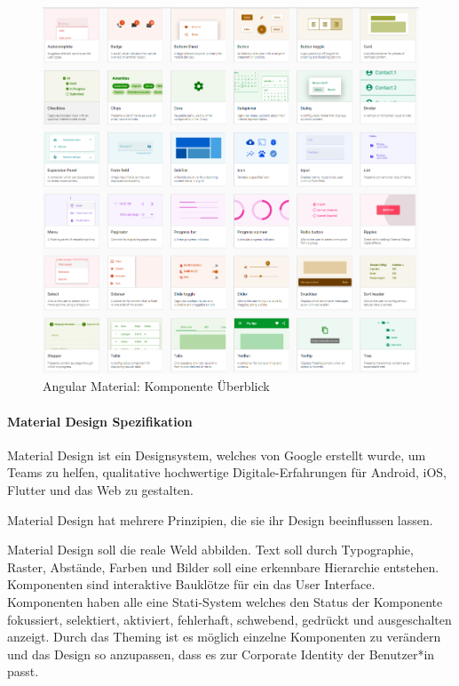 \begin{figure}
    \centering
    \includegraphics[scale=0.5]{pics/AngularMaterialsComponentsOverview.png}
    \caption{Angular Material: Komponente Überblick \cite{AngularComponents}}
    \label{fig:impl:angular-material-overview-components}
\end{figure}

\paragraph*{Material Design Spezifikation}
Material Design ist ein Designsystem, welches von Google erstellt wurde, um Teams zu helfen, qualitative hochwertige Digitale-Erfahrungen für Android, iOS, Flutter und das Web zu gestalten.

Material Design hat mehrere Prinzipien, die sie ihr Design beeinflussen lassen.

Material Design soll die reale Weld abbilden.
Text soll durch Typographie, Raster, Abstände, Farben und Bilder soll eine erkennbare Hierarchie entstehen. Komponenten sind interaktive Bauklötze für ein das User Interface. Komponenten haben alle eine Stati-System welches den Status der Komponente fokussiert, selektiert, aktiviert, fehlerhaft, schwebend, gedrückt und ausgeschalten anzeigt. Durch das Theming ist es möglich einzelne Komponenten zu verändern und das Design so anzupassen, dass es zur Corporate Identity der Benutzer*in passt.\cite{MaterialDesign-Introduction}

